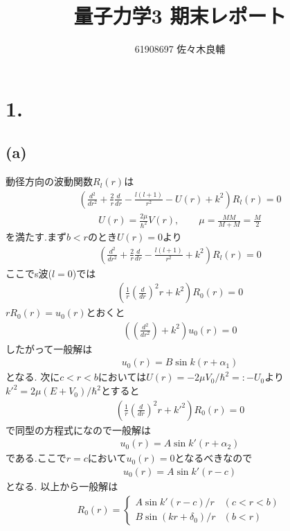 \documentclass[uplatex,a4j,11pt,dvipdfmx]{jsarticle}
\begin{document}
\title{量子力学3 期末レポート}
\author{61908697 佐々木良輔}
\date{}
\maketitle
\section*{1.}
\subsection*{(a)}
動径方向の波動関数$R_l(r)$は
\begin{align}
  \left(\frac{d^2}{dr^2}+\frac{2}{r}\frac{d}{dr}-\frac{l(l+1)}{r^2}-U(r)+k^2\right)R_l(r)=0
\end{align}
\begin{align}
  U(r)=\frac{2\mu}{\hbar^2}V(r),\qquad \mu=\frac{MM}{M+M}=\frac{M}{2}
\end{align}
を満たす.まず$b<r$のとき$U(r)=0$より
\begin{align}
  \left(\frac{d^2}{dr^2}+\frac{2}{r}\frac{d}{dr}-\frac{l(l+1)}{r^2}+k^2\right)R_l(r)=0
\end{align}
ここでs波($l=0$)では
\begin{align}
  \left(\frac{1}{r}\left(\frac{d}{dr}\right)^2r+k^2\right)R_0(r)=0
\end{align}
$rR_0(r)=u_0(r)$とおくと
\begin{align}
  \left(\left(\frac{d^2}{dr^2}\right)+k^2\right)u_0(r)=0
\end{align}
したがって一般解は
\begin{align}
  u_0(r)=B\sin k(r+\alpha_1)
\end{align}
となる.
次に$c<r<b$においては$U(r)=-2\mu V_0/\hbar^2=:-U_0$より$k'^2=2\mu(E+V_0)/\hbar^2$とすると
\begin{align}
  \left(\frac{1}{r}\left(\frac{d}{dr}\right)^2r+k'^2\right)R_0(r)=0
\end{align}
で同型の方程式になので一般解は
\begin{align}
  u_0(r)=A\sin k'(r+\alpha_2)
\end{align}
である.ここで$r=c$において$u_0(r)=0$となるべきなので
\begin{align}
  u_0(r)=A\sin k'(r-c)
\end{align}
となる.
以上から一般解は
\begin{align}
  R_0(r)=\left\{
  \begin{array}{ll}
    A\sin k'(r-c)/r&(c<r<b)\\
    B\sin (kr+\delta_0)/r&(b<r)
  \end{array}
  \right.
\end{align}
\end{document}
